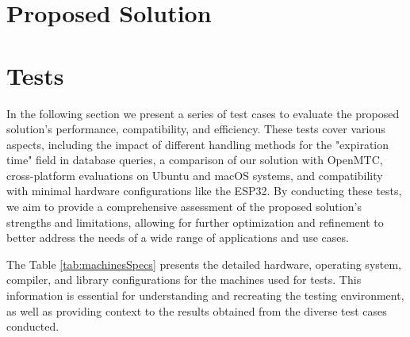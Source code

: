 \documentclass[a4paper,fleqn]{cas-dc}
\begin{document}
\section{Proposed Solution}

\section{Tests}
\label{tests}

In the following section we present a series of test cases to evaluate the proposed solution's performance, compatibility, and efficiency. These tests cover various aspects, including the impact of different handling methods for the "expiration time" field in database queries, a comparison of our solution with OpenMTC, cross-platform evaluations on Ubuntu and macOS systems, and compatibility with minimal hardware configurations like the ESP32. By conducting these tests, we aim to provide a comprehensive assessment of the proposed solution's strengths and limitations, allowing for further optimization and refinement to better address the needs of a wide range of applications and use cases.

The Table \ref{tab:machinesSpecs} presents the detailed hardware, operating system, compiler, and library configurations for the machines used for tests. This information is essential for understanding and recreating the testing environment, as well as providing context to the results obtained from the diverse test cases conducted.
\end{document}
